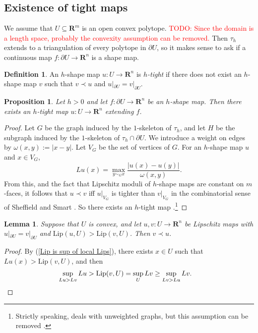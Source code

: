 \documentclass[reqno,11pt]{amsart}
\newcommand{\RR}{\mathbf{R}}
\newcommand{\Lip}{\mathrm{Lip}}
\newcommand{\dfn}[1]{\emph{#1}\index{#1}}
\newtheorem{lemma}[theorem]{Lemma}
\newtheorem{proposition}[theorem]{Proposition}
\theoremstyle{definition}
\newtheorem{definition}[theorem]{Definition}
\numberwithin{equation}{section}
\newcommand\todo[1]{\textcolor{red}{TODO: #1}}
\begin{document}
\subsection{Existence of tight maps}
We assume that $U \subseteq \RR^m$ is an open convex polytope.
\todo{Since the domain is a length space, probably the convexity assumption can be removed.}
Then $\tau_h$ extends to a triangulation of every polytope in $\partial U$, so it makes sense to ask if a continuous map $f: \partial U \to \RR^n$ is a shape map.

\begin{definition}
An $h$-shape map $u: U \to \RR^n$ is \dfn{$h$-tight} if there does not exist an $h$-shape map $v$ such that $v \prec u$ and $u|_{\partial U} = v|_{\partial U}$.
\end{definition}

\begin{proposition}\label{discrete wellposedness}
Let $h > 0$ and let $f: \partial U \to \RR^n$ be an $h$-shape map.
Then there exists an $h$-tight map $u: U \to \RR^n$ extending $f$.
\end{proposition}
\begin{proof}
Let $G$ be the graph induced by the $1$-skeleton of $\tau_h$, and let $H$ be the subgraph induced by the $1$-skeleton of $\tau_h \cap \partial U$.
We introduce a weight on edges by $\omega(x, y) := |x - y|$.
Let $V_G$ be the set of vertices of $G$.
For an $h$-shape map $u$ and $x \in V_G$,
$$Lu(x) = \max_{y \sim_G x} \frac{|u(x) - u(y)|}{\omega(x, y)}.$$
From this, and the fact that Lipschitz moduli of $h$-shape maps are constant on $m$-faces, it follows that $u \prec v$ iff $u|_{V_G}$ is tighter than $v|_{V_G}$ in the combinatorial sense of Sheffield and Smart \cite[\S1.2]{Sheffield12}.
So there exists an $h$-tight map \cite[Theorem 1.2]{Sheffield12}.\footnote{Strictly speaking, \cite{Sheffield12} deals with unweighted graphs, but this assumption can be removed \cite[Remark 2.2]{Sheffield12}.}
\end{proof}

\begin{lemma}\label{tight implies best lipschitz}
Suppose that $U$ is convex, and let $u, v: U \to \RR^n$ be Lipschitz maps with $u|_{\partial U} = v|_{\partial U}$ and $\Lip(u, U) > \Lip(v, U)$.
Then $v \prec u$.
\end{lemma}
\begin{proof}
By (\ref{Lip is sup of local Lips}), there exists $x \in U$ such that $Lu(x) > \Lip(v, U)$, and then
\begin{align*}
\sup_{Lu > Lv} Lu &> \Lip(v, U) = \sup_U Lv \geq \sup_{Lv > Lu} Lv. \qedhere
\end{align*}
\end{proof}
\end{document}
